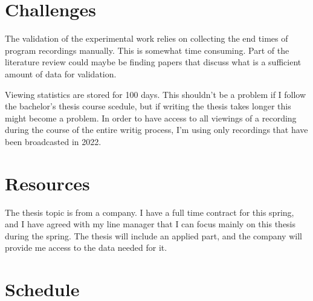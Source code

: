 \documentclass[12pt,a4paper,english,oneside]{article}
\begin{document}

\section{Challenges}

The validation of the experimental work relies on collecting the end times of program recordings manually. This is somewhat time consuming. Part of the literature review could maybe be finding papers that discuss what is a sufficient amount of data for validation.

Viewing statistics are stored for 100 days. This shouldn't be a problem if I follow the bachelor's thesis course scedule, but if writing the thesis takes longer this might become a problem. In order to have access to all viewings of a recording during the course of the entire writig process, I'm using only recordings that have been broadcasted in 2022.


\section{Resources}

The thesis topic is from a company. I have a full time contract for this spring, and I have agreed with my line manager that I can focus mainly on this thesis during the spring. The thesis will include an applied part, and the company will provide me access to the data needed for it.

\section{Schedule}
\end{document}

